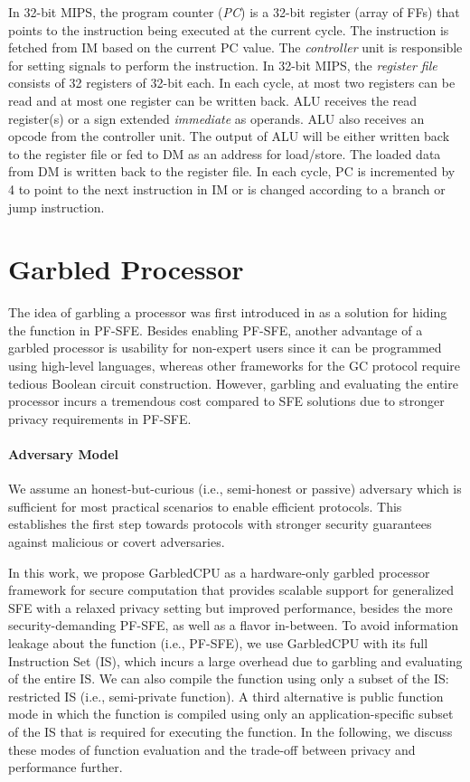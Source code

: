 In 32-bit MIPS, the program counter (\emph{PC}) is a 32-bit register (array of FFs) that points to the instruction being executed at the current cycle.
The instruction is fetched from IM based on the current PC value.
The \emph{controller} unit is responsible for setting signals to perform the instruction.
In 32-bit MIPS, the \emph{register file} consists of 32 registers of 32-bit each.
In each cycle, at most two registers can be read and at most one register can be written back.
ALU receives the read register(s) or a sign extended \emph{immediate} as operands.
ALU also receives an opcode from the controller unit.
The output of ALU will be either written back to the register file or fed to DM as an address for load/store.
The loaded data from DM is written back to the register file.
In each cycle, PC is incremented by 4 to point to the next instruction in IM or is changed according to a branch or jump instruction.

\section{Garbled Processor}
The idea of garbling a processor was first introduced in \cite{songhori2015tinygarble} as a solution for hiding the function in PF-SFE. Besides enabling PF-SFE, another advantage of a garbled processor is usability for non-expert users since it can be programmed using high-level languages, whereas other frameworks for the GC protocol require tedious Boolean circuit construction. However, garbling and evaluating the entire processor incurs a tremendous cost compared to SFE solutions due to stronger privacy requirements in PF-SFE.

\paragraph*{Adversary Model} We assume an honest-but-curious (i.e., semi-honest or passive) adversary which is sufficient for most practical scenarios to enable efficient protocols. This establishes the first step towards protocols with stronger security guarantees against malicious or covert adversaries.

In this work, we propose GarbledCPU as a hardware-only garbled processor framework for secure computation that provides scalable support for generalized SFE with a relaxed privacy setting but improved performance, besides the more security-demanding PF-SFE, as well as a flavor in-between. To avoid information leakage about the function (i.e., PF-SFE), we use GarbledCPU with its full Instruction Set (IS), which incurs a large overhead due to garbling and evaluating of the entire IS. We can also compile the function using only a subset of the IS: restricted IS (i.e., semi-private function). A third alternative is public function mode in which the function is compiled using only an application-specific subset of the IS that is required for executing the function. In the following, we discuss these modes of function evaluation and the trade-off between privacy and performance further.

